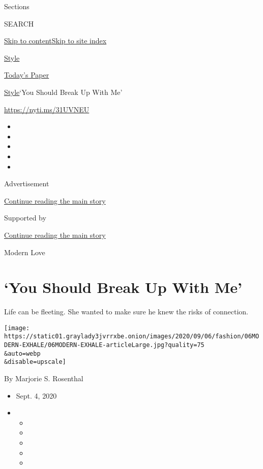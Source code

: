 Sections

SEARCH

\protect\hyperlink{site-content}{Skip to
content}\protect\hyperlink{site-index}{Skip to site index}

\href{https://www.nytimes3xbfgragh.onion/section/style}{Style}

\href{https://myaccount.nytimes3xbfgragh.onion/auth/login?response_type=cookie\&client_id=vi}{}

\href{https://www.nytimes3xbfgragh.onion/section/todayspaper}{Today's
Paper}

\href{/section/style}{Style}\textbar{}`You Should Break Up With Me'

\url{https://nyti.ms/31UVNEU}

\begin{itemize}
\item
\item
\item
\item
\item
\end{itemize}

Advertisement

\protect\hyperlink{after-top}{Continue reading the main story}

Supported by

\protect\hyperlink{after-sponsor}{Continue reading the main story}

Modern Love

\hypertarget{you-should-break-up-with-me}{%
\section{`You Should Break Up With
Me'}\label{you-should-break-up-with-me}}

Life can be fleeting. She wanted to make sure he knew the risks of
connection.

\texttt{[image: https://static01.graylady3jvrrxbe.onion/images/2020/09/06/fashion/06MODERN-EXHALE/06MODERN-EXHALE-articleLarge.jpg?quality=75\\\&auto=webp\\\&disable=upscale]}

By Marjorie S. Rosenthal

\begin{itemize}
\item
  Sept. 4, 2020
\item
  \begin{itemize}
  \item
  \item
  \item
  \item
  \item
  \end{itemize}
\end{itemize}

